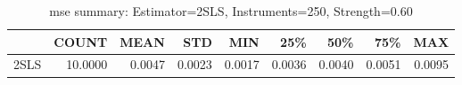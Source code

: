 \begin{table}[ht]
\centering
\caption{mse summary: Estimator=2SLS, Instruments=250, Strength=0.60}
\begin{tabular}{lrrrrrrrr}
\toprule
 & COUNT & MEAN & STD & MIN & 25\% & 50\% & 75\% & MAX \\
\midrule
2SLS & 10.0000 & 0.0047 & 0.0023 & 0.0017 & 0.0036 & 0.0040 & 0.0051 & 0.0095 \\
\bottomrule
\end{tabular}
\end{table}
